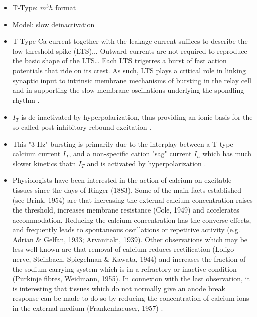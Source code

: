 \documentclass[./workflow.tex]{subfiles}
\begin{document}
\begin{itemize}
        \item T-Type: $m^3h$ format \parencite{wangModelTtypeCalcium1991}
        
        \item Model: slow deinactivation \parencite{wangModelTtypeCalcium1991}
        
        \item T-Type Ca current together with the leakage current suffices to describe the low-threshold
        spike (LTS)... Outward currents are not required to reproduce the basic shape of the LTS\dots
        Each LTS trigerres a burst of fast action potentials that ride on its crest. As such,
        LTS plays a critical role in linking synaptic input to intrinsic membrane mechanisms of bursting in
        the relay cell and in supporting the slow membrane oscillations underlying the spondling rhythm
        \parencite{wangModelTtypeCalcium1991}.

        \item $I_T$ is de-inactivated by hyperpolarization, thus providing an ionic basis for the so-called
        post-inhibitory rebound excitation \parencite{wangMultipleDynamicalModes1994}.

        \item This "3 Hz" bursting is primarily due to the interplay between a T-type calcium current
        $I_T$, and a non-specific cation "sag" current $I_h$ which has much slower kinetics thatn $I_T$
        and is activated by hyperpolarization \parencite{wangMultipleDynamicalModes1994}.
        
        \item Physiologists have been interested in the action of calcium on excitable tissues since
        the days of Ringer (1883). Some of the main facts established (see Brink, 1954) are that
        increasing the external calcium concentration raises the threshold, increases membrane
        resistance (Cole, 1949) and accelerates accommodation. Reducing the calcium concentration
        has the converse effects, and frequently leads to spontaneous oscillations or
        repetitive activity (e.g. Adrian \& Gelfan, 1933; Arvanitaki, 1939). Other observations
        which may be less well known are that removal of calcium reduces rectification
        (Loligo nerve, Steinbach, Spiegelman \& Kawata, 1944) and increases the fraction of the
        sodium carrying system which is in a refractory or inactive condition
        (Purkinje fibres, Weidmann, 1955). In connexion with the last observation, it is interesting
        that tissues which do not normally give an anode break response can be made to do so by
        reducing the concentration of calcium ions in the external medium
        (Frankenhaeuser, 1957) \parencite{frankenhaeuserActionCalciumElectrical1957}.
    \end{itemize}
\end{document}
